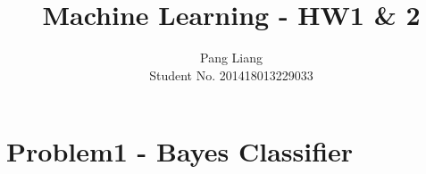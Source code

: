 \documentclass[12pt]{article}
\title{Machine Learning - HW1 \& 2}
\author{Pang Liang\\ Student No. 201418013229033}
\begin{document}
\maketitle



\section{Problem1 - Bayes Classifier}


\end{document}
